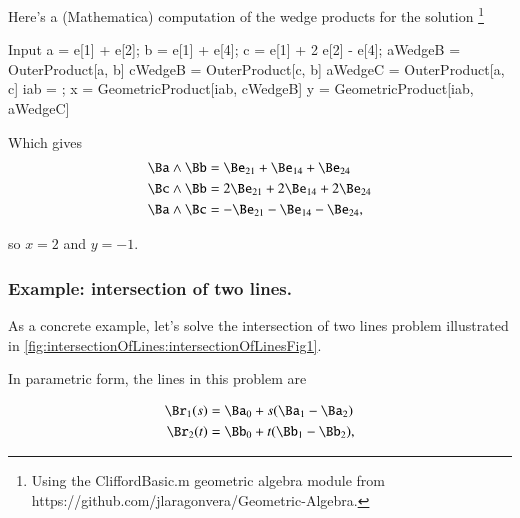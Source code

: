 Here's a (Mathematica) computation of the wedge products for the solution
\footnote{
Using the
CliffordBasic.m
geometric algebra module from
https://github.com/jlaragonvera/Geometric-Algebra.
}

\begin{mmaCell}[moredefined={a, b, c, iab, aWedgeB, cWedgeB, aWedgeC, \
x, y, e, OuterProduct, GeometricProduct}]{Input}
a = e[1] + e[2];
b = e[1] + e[4];
c = e[1] + 2 e[2] - e[4];
aWedgeB = OuterProduct[a, b]
cWedgeB = OuterProduct[c, b]
aWedgeC = OuterProduct[a, c]
iab = ;
x = GeometricProduct[iab, cWedgeB]
y = GeometricProduct[iab, aWedgeC]
\end{mmaCell}

Which gives
\begin{dmath}\label{eqn:solutionOfLinearSystem:1300}
\begin{aligned}
\Ba \wedge \Bb &= \Be_{21} + \Be_{14} + \Be_{24} \\
\Bc \wedge \Bb &= 2 \Be_{21} + 2 \Be_{14} + 2 \Be_{24} \\
\Ba \wedge \Bc &= -\Be_{21} - \Be_{14} - \Be_{24},
\end{aligned}
\end{dmath}

so \( x = 2 \) and \( y = -1 \).

\subsubsection{Example: intersection of two lines.}

As a concrete example, let's solve the intersection of two lines problem illustrated in \cref{fig:intersectionOfLines:intersectionOfLinesFig1}.


In parametric form, the lines in this problem are

\begin{dmath}\label{eqn:solutionOfLinearSystem:1000}
\begin{aligned}
\Br_1(s) &= \Ba_0 + s( \Ba_1 - \Ba_2 ) \\
\Br_2(t) &= \Bb_0 + t( \Bb_1 - \Bb_2 ),
\end{aligned}
\end{dmath}

